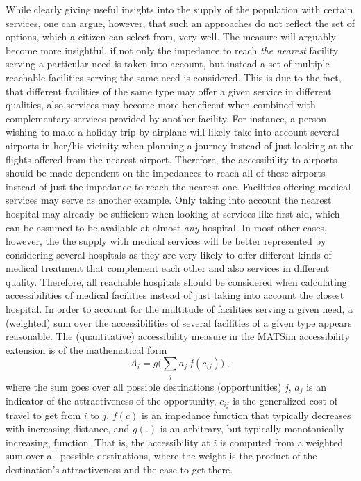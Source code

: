 While clearly giving useful insights into the supply of the population with certain services, one can argue, however, that such an approaches do not reflect the set of options, which a citizen can select from, very well. The measure will
arguably become more insightful, if not only the impedance to reach \textit{the nearest} facility serving a particular need is taken into account, but instead a set of multiple reachable facilities serving the same need is considered. This is due to the fact, that different facilities of the same type may offer a given service in different qualities, also services may become more beneficent when combined with complementary services provided by another facility. For instance, a person wishing to make a holiday trip by airplane will likely take into account several airports in her/his vicinity when planning a journey instead of just looking at the flights offered from the nearest airport. Therefore, the accessibility to airports should be made dependent on the impedances to reach all of these airports instead of just the impedance to reach the nearest one. Facilities offering medical services may serve as another example. Only taking into account the nearest hospital may already be sufficient when looking at services like first aid, which can be assumed to be available at almost \textit{any} hospital. In most other cases, however, the the supply with medical services will be better represented by considering several hospitals as they are very likely to offer different kinds of medical treatment that complement each other and also services in different quality. Therefore, all reachable hospitals should be considered when calculating accessibilities of medical facilities instead of just taking into account the closest hospital. In order to account for the multitude of facilities serving a given need, a (weighted) sum over the accessibilities of several facilities of a given type appears reasonable. The (quantitative) accessibility measure in the MATSim accessibility extension is of the mathematical form
\begin{equation}
A_i = g\Big( \sum_j a_j \, f(c_{ij}) \Big) \ ,
\label{eq:accessibility:basic}
\end{equation}
where the sum goes over all possible destinations (opportunities) $j$, $a_j$ is an indicator of the attractiveness of the opportunity, $c_{ij}$ is the generalized cost of travel to get from $i$ to $j$, $f(c)$ is an impedance function that typically decreases with increasing distance, and $g(.)$ is an arbitrary, but typically monotonically increasing, function.  That is, the accessibility at $i$ is computed from a weighted sum over all possible destinations, where the weight is the product of the destination's attractiveness and the ease to get there.

